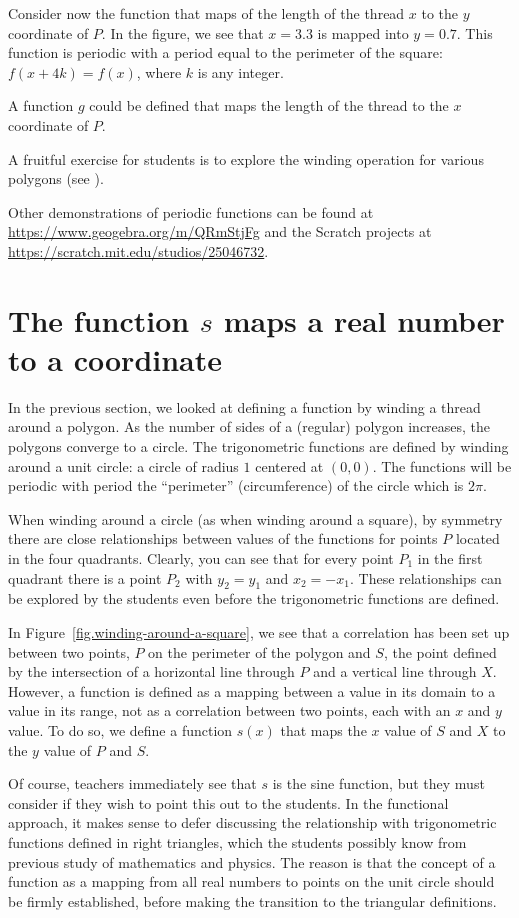 Consider now the function that maps of the length of the thread $x$ to the $y$ coordinate of $P$. In the figure, we see that $x=3.3$ is mapped into $y=0.7$.
This function is periodic with a period equal to the perimeter of the square: $f(x+4k)=f(x)$, where $k$ is any integer.

A function $g$ could be defined that maps the length of the thread to the $x$ coordinate of $P$.

A fruitful exercise for students is to explore the winding operation for various polygons (see ).

Other demonstrations of periodic functions can be found at \url{https://www.geogebra.org/m/QRmStjFg} and the Scratch projects at \url{https://scratch.mit.edu/studios/25046732}.


\section{The function $s$ maps a real number to a coordinate}

In the previous section, we looked at defining a function by winding a thread around a polygon. As the number of sides of a (regular) polygon increases, the polygons converge to a circle. The trigonometric functions are defined by winding around a unit circle: a circle of radius $1$ centered at $(0,0)$. The functions will be periodic with period the ``perimeter'' (circumference) of the circle which is $2\pi$.

When winding around a circle (as when winding around a square), by symmetry there are close relationships between values of the functions for points $P$ located in the four quadrants.
Clearly, you can see that for every point $P_1$ in the first quadrant there is a point $P_2$ with $y_2=y_1$ and $x_2=-x_1$.
These relationships can be explored by the students even before the trigonometric functions are defined.

In Figure~\ref{fig.winding-around-a-square}, we see that a correlation has been set up between two points, $P$ on the perimeter of the polygon and $S$, the point defined by the intersection of a horizontal line through $P$ and a vertical line through $X$.
However, a function is defined as a mapping between a value in its domain to a value in its range, not as a correlation between two points, each with an $x$ and $y$ value.
To do so, we define a function $s(x)$ that maps the $x$ value of $S$ and $X$ to the $y$ value of $P$ and $S$.

Of course, teachers immediately see that $s$ is the sine function, but they must consider if they wish to point this out to the students.
In the functional approach, it makes sense to defer discussing the relationship with trigonometric functions defined in right triangles, which the students possibly know from previous study of mathematics and physics.
The reason is that the concept of a function as a mapping from all real numbers to points on the unit circle should be firmly established, before making the transition to the triangular definitions.

